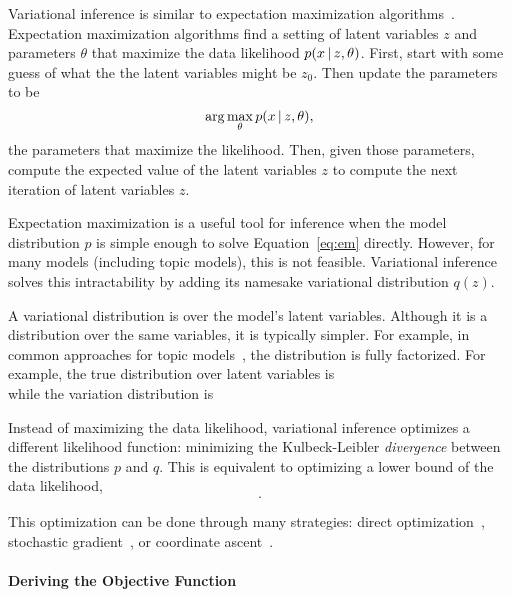 Variational inference is similar to expectation maximization
algorithms~\cite{}.  Expectation maximization algorithms find a
setting of latent variables $z$ and parameters $\theta$ that maximize
the data likelihood $p(x \, | \, z, \theta)$.  First, start with some guess
of what the the latent variables might be $z_0$.  Then update the
parameters to be
\begin{equation}
  \arg \max_{\theta} p(x \, | \, z, \theta),
\label{eq:em}
\end{equation}
the parameters that maximize the likelihood.  Then, given those
parameters, compute the expected value of the latent variables $z$ to
compute the next iteration of latent variables $z$.

Expectation maximization is a useful tool for inference when the model
distribution $p$ is simple enough to solve Equation~\ref{eq:em}
directly.  However, for many models (including topic models), this is
not feasible.  Variational inference solves this intractability by
adding its namesake variational distribution $q(z)$.

A variational distribution is over the model's latent variables.
Although it is a distribution over the same variables, it is typically
simpler.  For example, in common approaches for topic models~\citep{}, the
distribution is fully factorized.  For example, the true distribution
over latent variables is
\begin{equation}

\end{equation}
while the variation distribution is
\begin{equation}

\end{equation}

Instead of maximizing the data likelihood, variational inference
optimizes a different likelihood function: minimizing the Kulbeck-Leibler
\emph{divergence} between the distributions $p$ and $q$.  This is
equivalent to optimizing a lower bound of the data likelihood,
\begin{equation}
.
\end{equation}

This optimization can be done through many strategies: direct
optimization~\cite{}, stochastic gradient~\cite{}, or coordinate
ascent~\cite{}.

\paragraph{Deriving the Objective Function}

